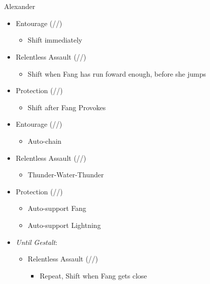 \chapter[Chapter 11]{}

\renewcommand{\first}{[1] Entourage (\rav/\med/\sen)}
\renewcommand{\second}{[2] Protection (\syn/\med/\sen)}
\renewcommand{\third}{[3] }
\renewcommand{\fourth}{[4] }
\renewcommand{\fifth}{[5] }
\renewcommand{\sixth}{[6] Relentless Assault (\rav/\rav/\com)}
\begin{battle}{Alexander}
\begin{itemize}
    \item \first
    \begin{itemize}
        \item Shift immediately
    \end{itemize}
    \item \sixth
    \begin{itemize}
        \item Shift when Fang  has run foward enough, before she jumps
    \end{itemize}
    \item \second
    \begin{itemize}
        \item Shift after Fang Provokes
    \end{itemize}
    \item \first
    \begin{itemize}
        \item Auto-chain
    \end{itemize}
    \item \sixth
    \begin{itemize}
        \item Thunder-Water-Thunder
    \end{itemize}
    \item \second
    \begin{itemize}
        \item Auto-support Fang
        \item Auto-support Lightning
    \end{itemize}
    \item \textit{Until Gestalt}:
    \begin{itemize}
        \item \begin{flushleft}\sixth\end{flushleft}
        \begin{itemize}
            \item Repeat, Shift when Fang gets close

\end{itemize}
\end{itemize}
\end{itemize}
\end{battle}
